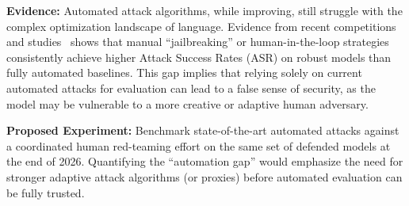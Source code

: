 \begin{enumerate}
    \textbf{Evidence:} 
    Automated attack algorithms, while improving, still struggle with the complex optimization landscape of language. Evidence from recent competitions and studies~\cite{li2024llm, andriushchenko2024jailbreaking, nasr2025attacker} shows that manual \enquote{jailbreaking} or human-in-the-loop strategies consistently achieve higher Attack Success Rates (ASR) on robust models than fully automated baselines. This gap implies that relying solely on current automated attacks for evaluation can lead to a false sense of security, as the model may be vulnerable to a more creative or adaptive human adversary.
    
    \textbf{Proposed Experiment:} 
    Benchmark state-of-the-art automated attacks against a coordinated human red-teaming effort on the same set of defended models at the end of 2026. Quantifying the \enquote{automation gap} would emphasize the need for stronger adaptive attack algorithms (or proxies) before automated evaluation can be fully trusted.
\end{enumerate}
